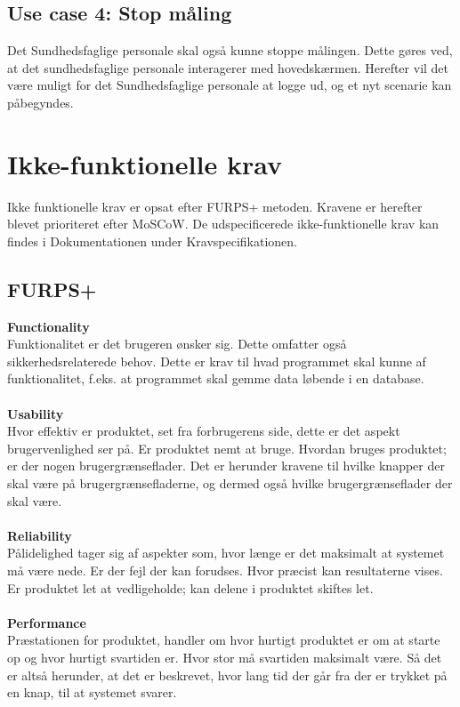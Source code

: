 \subsection{Use case 4: Stop måling}
Det Sundhedsfaglige personale skal også kunne stoppe målingen. Dette gøres ved, at det sundhedsfaglige personale interagerer med hovedskærmen. Herefter vil det være muligt for det Sundhedsfaglige personale at logge ud, og et nyt scenarie kan påbegyndes.
\section{Ikke-funktionelle krav}
Ikke funktionelle krav er opsat efter FURPS+ metoden. Kravene er herefter blevet prioriteret efter MoSCoW. De udspecificerede ikke-funktionelle krav kan findes i Dokumentationen under Kravspecifikationen.
\subsection{FURPS+}
\textbf{Functionality}\\
Funktionalitet er det brugeren ønsker sig. Dette omfatter også sikkerhedsrelaterede behov. Dette er krav til hvad programmet skal kunne af funktionalitet, f.eks. at programmet skal gemme data løbende i en database.\\\\
\textbf{Usability}\\
Hvor effektiv er produktet, set fra forbrugerens side, dette er det aspekt brugervenlighed ser på. Er produktet nemt at bruge. Hvordan bruges produktet; er der nogen brugergrænseflader. Det er herunder kravene til hvilke knapper der skal være på brugergrænsefladerne, og dermed også hvilke brugergrænseflader der skal være.\\\\
\textbf{Reliability}\\
Pålidelighed tager sig af aspekter som, hvor længe er det maksimalt at systemet må være nede. Er der fejl der kan forudses. Hvor præcist kan resultaterne vises. Er produktet let at vedligeholde; kan delene i produktet skiftes let.\\\\
\textbf{Performance}\\
Præstationen for produktet, handler om hvor hurtigt produktet er om at starte op og hvor hurtigt svartiden er. Hvor stor må svartiden maksimalt være. Så det er altså herunder, at det er beskrevet, hvor lang tid der går fra der er trykket på en knap, til at systemet svarer. \\\\
